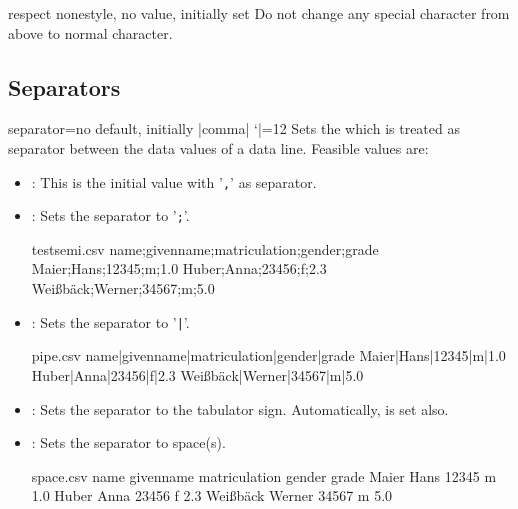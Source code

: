 \documentclass[a4paper,11pt]{ltxdoc}
\begin{document}
\begin{docCsvKey}{respect none}{}{style, no value, initially set}
  Do not change any special character from above to normal character.
\end{docCsvKey}

\clearpage
\subsection{Separators}\label{sec:separators}%
\begin{docCsvKey}{separator}{=}{no default, initially |comma|}
  \catcode `|=12
  Sets the  which is treated as separator between the data values
  of a data line. Feasible values are:
  \begin{itemize}
  \item{}: This is the initial value with '\texttt{,}' as separator.
  \medskip

  \item{}: Sets the separator to '\texttt{;}'.
\begin{dispExample}
\begin{tcbverbatimwrite}{testsemi.csv}
  name;givenname;matriculation;gender;grade
  Maier;Hans;12345;m;1.0
  Huber;Anna;23456;f;2.3
  Weißbäck;Werner;34567;m;5.0
\end{tcbverbatimwrite}

\end{dispExample}
\medskip

\item{}: Sets the separator to '\texttt{|}'.
\begin{dispExample}
\begin{tcbverbatimwrite}{pipe.csv}
  name|givenname|matriculation|gender|grade
  Maier|Hans|12345|m|1.0
  Huber|Anna|23456|f|2.3
  Weißbäck|Werner|34567|m|5.0
\end{tcbverbatimwrite}

\end{dispExample}
\medskip

\item{}: Sets the separator to the tabulator sign.
  Automatically,  is set also.

\clearpage
\item{}:
  Sets the separator to space(s).
\begin{dispExample}
\begin{tcbverbatimwrite}{space.csv}
  name     givenname matriculation gender grade
  Maier    Hans      12345         m      1.0
  Huber    Anna      23456         f      2.3
  Weißbäck Werner    34567         m      5.0
\end{tcbverbatimwrite}


\end{dispExample}
\end{itemize}
\end{docCsvKey}
\end{document}
